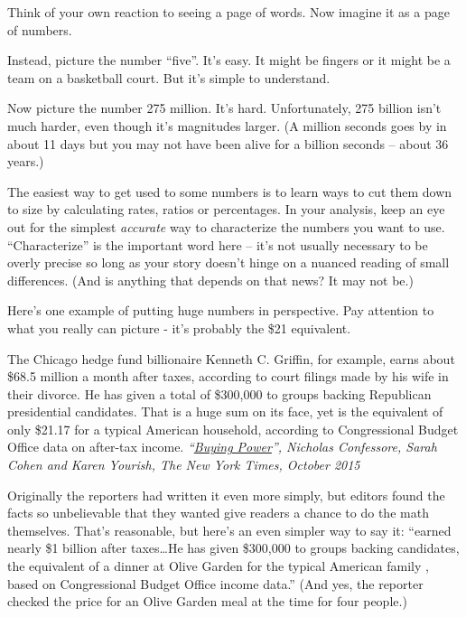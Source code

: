 \documentclass[
  letterpaper,
  DIV=11,
  numbers=noendperiod]{scrreprt}
\begin{document}
Think of your own reaction to seeing a page of words. Now imagine it as
a page of numbers.

Instead, picture the number ``five''. It's easy. It might be fingers or
it might be a team on a basketball court. But it's simple to understand.

Now picture the number 275 million. It's hard. Unfortunately, 275
billion isn't much harder, even though it's magnitudes larger. (A
million seconds goes by in about 11 days but you may not have been alive
for a billion seconds -- about 36 years.)

The easiest way to get used to some numbers is to learn ways to cut them
down to size by calculating rates, ratios or percentages. In your
analysis, keep an eye out for the simplest \emph{accurate} way to
characterize the numbers you want to use. ``Characterize'' is the
important word here -- it's not usually necessary to be overly precise
so long as your story doesn't hinge on a nuanced reading of small
differences. (And is anything that depends on that news? It may not be.)

Here's one example of putting huge numbers in perspective. Pay attention
to what you really can picture - it's probably the \$21 equivalent.

The Chicago hedge fund billionaire Kenneth C. Griffin, for example,
earns about \$68.5 million a month after taxes, according to court
filings made by his wife in their divorce. He has given a total of
\$300,000 to groups backing Republican presidential candidates. That is
a huge sum on its face, yet is the equivalent of only \$21.17 for a
typical American household, according to Congressional Budget Office
data on after-tax income.
\emph{``\href{https://www.nytimes.com/interactive/2015/10/11/us/politics/2016-presidential-election-super-pac-donors.html}{Buying
Power}'', Nicholas Confessore, Sarah Cohen and Karen Yourish, The New
York Times, October 2015}

Originally the reporters had written it even more simply, but editors
found the facts so unbelievable that they wanted give readers a chance
to do the math themselves. That's reasonable, but here's an even simpler
way to say it: ``earned nearly \$1 billion after taxes\ldots He has
given \$300,000 to groups backing candidates, the equivalent of a dinner
at Olive Garden for the typical American family , based on Congressional
Budget Office income data.'' (And yes, the reporter checked the price
for an Olive Garden meal at the time for four people.)
\end{document}
